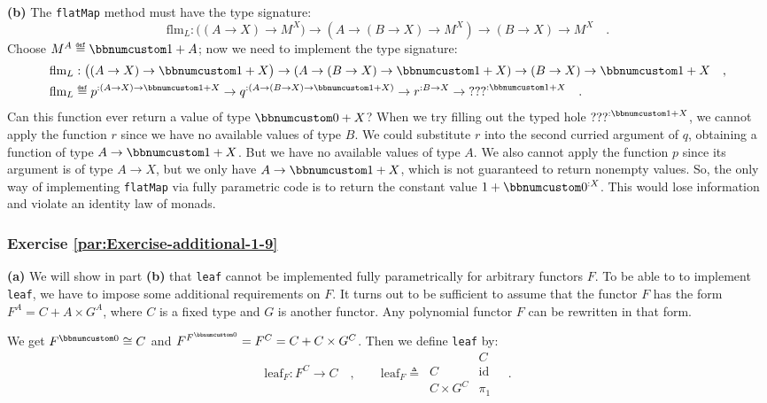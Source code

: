 \textbf{(b)} The \lstinline!flatMap! method must have the type signature:
\[
\text{flm}_{L}:\big((A\rightarrow X)\rightarrow M^{X}\big)\rightarrow(A\rightarrow(B\rightarrow X)\rightarrow M^{X})\rightarrow(B\rightarrow X)\rightarrow M^{X}\quad.
\]
Choose $M^{A}\triangleq\bbnum 1+A$; now we need to implement the
type signature:
\begin{align*}
 & \text{flm}_{L}:\big((A\rightarrow X)\rightarrow\bbnum 1+X\big)\rightarrow\left(A\rightarrow(B\rightarrow X)\rightarrow\bbnum 1+X\right)\rightarrow(B\rightarrow X)\rightarrow\bbnum 1+X\quad,\\
 & \text{flm}_{L}\triangleq p^{:(A\rightarrow X)\rightarrow\bbnum 1+X}\rightarrow q^{:\left(A\rightarrow(B\rightarrow X)\rightarrow\bbnum 1+X\right)}\rightarrow r^{:B\rightarrow X}\rightarrow\text{???}^{:\bbnum 1+X}\quad.
\end{align*}
Can this function ever return a value of type $\bbnum 0+X$? When
we try filling out the typed hole $\text{???}^{:\bbnum 1+X}$, we
cannot apply the function $r$ since we have no available values of
type $B$. We could substitute $r$ into the second curried argument
of $q$, obtaining a function of type $A\rightarrow\bbnum 1+X$. But
we have no available values of type $A$. We also cannot apply the
function $p$ since its argument is of type $A\rightarrow X$, but
we only have $A\rightarrow\bbnum 1+X$, which is not guaranteed to
return nonempty values. So, the only way of implementing \lstinline!flatMap!
via fully parametric code is to return the constant value $1+\bbnum 0^{:X}$.
This would lose information and violate an identity law of monads.


\subsubsection*{Exercise \ref{par:Exercise-additional-1-9}}

\textbf{(a)} We will show in part \textbf{(b)} that \lstinline!leaf!
cannot be implemented fully parametrically for arbitrary functors
$F$. To be able to to implement \lstinline!leaf!, we have to impose
some additional requirements on $F$. It turns out to be sufficient
to assume that the functor $F$ has the form $F^{A}=C+A\times G^{A}$,
where $C$ is a fixed type and $G$ is another functor. Any polynomial
functor $F$ can be rewritten in that form.

We get $F^{\bbnum 0}\cong C$ and $F^{F^{\bbnum 0}}=F^{C}=C+C\times G^{C}$.
Then we define \lstinline!leaf! by:
\[
\text{leaf}_{F}:F^{C}\rightarrow C\quad,\quad\quad\text{leaf}_{F}\triangleq\,\begin{array}{|c||c|}
 & C\\
\hline C & \text{id}\\
C\times G^{C} & \pi_{1}
\end{array}\quad.
\]

